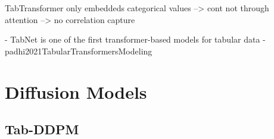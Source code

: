 TabTransformer only embeddeds categorical values --> cont not through attention --> no correlation capture \cite{somepalli2021SAINTImprovedNeural}

- TabNet is one of the first transformer-based models for tabular data \cite{borisov2022DeepNeuralNetworks}
- padhi2021TabularTransformersModeling


\section{Diffusion Models}
\label{ch:relatedWork-diffusionModels}

\subsection{Tab-DDPM}
\label{ch:relatedWork-diffusionModels-tabDDPM}



